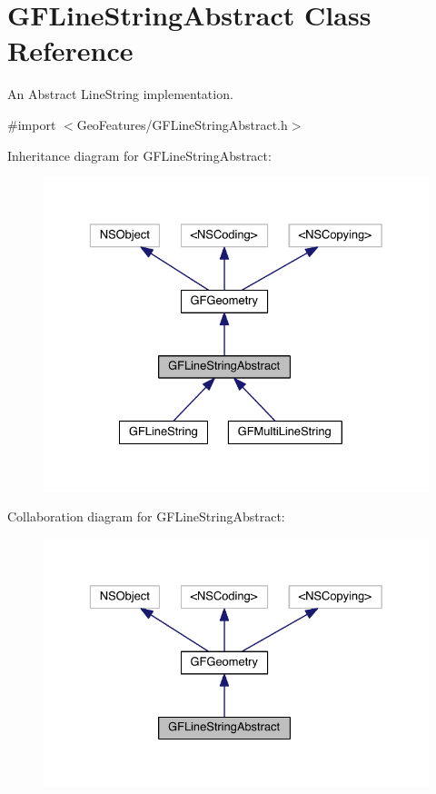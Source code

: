 \hypertarget{interface_g_f_line_string_abstract}{}\section{G\+F\+Line\+String\+Abstract Class Reference}
\label{interface_g_f_line_string_abstract}


An Abstract Line\+String implementation.  




{\ttfamily \#import $<$Geo\+Features/\+G\+F\+Line\+String\+Abstract.\+h$>$}



Inheritance diagram for G\+F\+Line\+String\+Abstract\+:\nopagebreak
\begin{figure}[H]
\begin{center}
\leavevmode
\includegraphics[width=329pt]{interface_g_f_line_string_abstract__inherit__graph}
\end{center}
\end{figure}


Collaboration diagram for G\+F\+Line\+String\+Abstract\+:\nopagebreak
\begin{figure}[H]
\begin{center}
\leavevmode
\includegraphics[width=329pt]{interface_g_f_line_string_abstract__coll__graph}
\end{center}
\end{figure}
